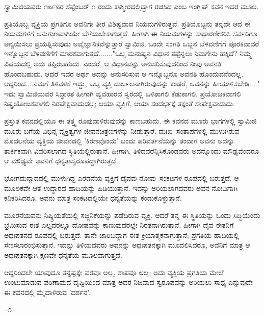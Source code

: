 ಸ್ವಾಮಿಜಿಯವರು ೧೮೯೮ರ ಸೆಪ್ಟೆಂಬರ್ ೧ ರಂದು ಕಾಶ್ಮೀರದಲ್ಲಿದ್ದಾಗ ರಚಿಸಿದ  ಎಂಬ ಇಂಗ್ಲಿಷ್ ಕವನ ಇದರ ಮೂಲ.

ಪ್ರತಿಯೊಬ್ಬ ವ್ಯಕ್ತಿಯ ಪ್ರಗತಿಗೂ ಅವನಿಗೇ ತೀರ ವಿಶಿಷ್ಟವಾದ ನಿಯಮಗಳಿರುತ್ತವೆ. ಪ್ರತಿಯೊಬ್ಬನು ತನ್ನದೇ ಆದ ಈ ನಿಯಮಗಳಿಗೆ ಅನುಗುಣವಾಗಿಯೇ ಬೆಳೆಯಬೇಕಾಗುತ್ತದೆ. ಹೀಗಾಗಿ ಈ ನಿಯಮಗಳನ್ನು ಸಾಧಾರಣೀಕರಿಸಿ ಸರ್ವರಿಗೂ ಅನ್ವಯಿಸಲು ಪ್ರಯತ್ನಿಸುವುದು ಅವೈಜ್ಞಾನಿಕವೆನ್ನುತ್ತಾರೆ ಸ್ವಾಮಿಜಿ, ಒಂದೇ ಸಂಗತಿ ಒಬ್ಬನ ಬೆಳವಣಿಗೆಗೆ ಪೂರಕವಾದರೆ ಇನ್ನೊಬ್ಬನ ಬೆಳವಣಿಗೆಗೆ ಮಾರಕವಾಗುತ್ತದೆ......."ಒಬ್ಬ ಮನುಷ್ಯನ ವಿಧಾನ ತಪ್ಪೆನ್ನಲು ನಿಮಗೇನು ಹಕ್ಕಿದೆ? ನಿಮ್ಮ ವಿಷಯದಲ್ಲಿ ಅದು ತಪ್ಪಿರಬಹುದು. ಎಂದರೆ, ಆ ವಿಧಾನವನ್ನು ಅನುಸರಿಸುವುದರಿಂದ ನೀವು ಅವನತಿ ಹೊಂದಬಹುದು. ಆದರೆ ಇದರ ಅರ್ಥ ಅದನ್ನು ಅನುಸರಿಸುವ ಆ ಇನ್ನೊಬ್ಬನೂ ಅವನತಿ ಹೊಂದುವನೆಂದಲ್ಲ. ಆದ್ದರಿಂದ....ನಿಮಗೆ ತಿಳಿವಳಿಕೆ ಇದ್ದು, ಒಬ್ಬ ವ್ಯಕ್ತಿ ದುರ್ಬಲನಾಗಿರುವುದನ್ನು ಕಂಡರೆ, ಅವನನ್ನು ಹೀಯಾಳಿಸಬೇಡಿ...." ಇದು ಸ್ವಾಮಿಜಿಯವರ ಸಿದ್ಧಾಂತ  ಹೀಗಾಗಿ ವ್ಯವಹಾರದ ಸ್ವರದಲ್ಲಿ ಒಳಿತಾಗಲಿ ಕೆಡುಕಾಗಲಿ, ಪ್ರಯೋಜಕವಾಗಲಿ ನಿಷ್ಪ್ರಯೋಜಕವಾಗಲಿ ನಿರಪೇಕ್ಷವಾದುದಲ್ಲ; ಆಯಾ ವ್ಯಕ್ತಿಗೆ, ಆಯಾ ಸಂದರ್ಭಕ್ಕೆ ತಕ್ಕಂತೆ ಸಾಪೇಕ್ಷವಾದುದು.

ಪ್ರಸ್ತುತ ಕವನದಲ್ಲಿಯೂ ಈ ತತ್ತ್ವ ರೂಪುದಾಳಿರುವುದನ್ನು ಕಾಣಬಹುದು. ಈ ಕವನದ ಮೂರು ಭಾಗಗಳಲ್ಲಿ ಸ್ವಾಮಿಜಿ ಮೂರು ಬಗೆಯ ವಿಭಿನ್ನ ವ್ಯಕ್ತಿತ್ವಗಳ ಜೀವನಚಿತ್ರಣಗಳನ್ನು ನೀಡುತ್ತಾರೆ. ದುಃಖ–ಸಂತಾಪಗಳಲ್ಲಿ ಮುಳುಗಿರುವ ಮೊದಲನೆಯ ವ್ಯಕ್ತಿಯ ಜೀವನದಲ್ಲಿ 'ಕಿರಣವೊಂದು' ಬಂದು ಪರಿವರ್ತನೆಯನ್ನು ತಂದಾಗ ಅವನು ಅದನ್ನು ತಾರ್ಕಿಕವಾಗಿ ವಿವರಿಸಲಾಗದ ಸ್ಥಿತಿಯಲ್ಲಿರುತ್ತಾನೆ. ಹೀಗಾಗಿ, ತಿಳಿದವರೆನ್ನಿಸಿಕೊಂಡವರು ಅದನ್ನೊಂದು ಮೌಢ್ಯವೆಂದರೂ ಆ ಮೌಢ್ಯವೇ ಅವನಿಗೆ ಧನ್ಯತಾಸ್ವರೂಪದ್ದಾಗಿರುತ್ತದೆ.

ಭೋಗದುನ್ಮಾದದಲ್ಲಿ ಮುಳುಗಿದ್ದ ಎರಡನೆಯ ವ್ಯಕ್ತಿಗೆ ದೈವವು ನೋವು–ಸಂಕಟಗಳ ರೂಪದಲ್ಲಿ ಬರುತ್ತದೆ. ಆ ಮೂಲಕವೇ ಆತ ಉದ್ಧಾರದ ಹಾದಿಯನ್ನು ಹಿಡಿಯುತ್ತಾನೆ. ಇದನ್ನು ಅರಿಯಲಾಗದವರು ಅವನ ನೋವಿಗಾಗಿ ಕನಿಕರಿಸಿದರೂ, ಅವನು ಮಾತ್ರ ಸಂಕಟದಲ್ಲಿಯೇ ಧನ್ಯತೆಯನ್ನು ಕಂಡುಕೊಳ್ಳುತ್ತಾನೆ.

ಮೂರನೆಯವನು ನಿಷ್ಕ್ರಿಯತೆಯಲ್ಲಿ ಸಜ್ಜನಿಕೆಯನ್ನು ಪಡೆದಿರುವ ವ್ಯಕ್ತಿ. ಆದರೆ ತನ್ನ ಈ ಸ್ಥಿತಿಯನ್ನು ಒಂದು ಸಿದ್ಧಿಯೆಂದು ಭ್ರಮಿಸುವ ಈತ ಎಲ್ಲದರಲ್ಲೂ ದೋಷವನ್ನು ಕಾಣುವುದರಲ್ಲೇ ನಿರತನಾಗಿರುತ್ತಾನೆ. ಹೀಗಾಗಿ ದೈವ ಈತನಿಗೆ ಅಧಃಪತನದ ರೂಪದಲ್ಲಿ ಬರುತ್ತದೆ. ತಾನೇ ಜಾರಿಬಿದ್ದಾಗ ಈತ ಕ್ರಿಯಾತ್ಮಕನಾಗುತ್ತಾನೆ; ಪ್ರಗತಿಯ ಹಾದಿಯಲ್ಲಿ ಸೆಣಸಲಾರಂಭಿಸುತ್ತಾನೆ. ಇದನ್ನು ತಿಳಿಯದವರು ಅವನನ್ನು ಅಧಃಪತನಕ್ಕಾಗಿ ಮೂದಲಿಸಿದರೂ, ಅವನಿಗೆ ಮಾತ್ರ ಆ ಅಧಃಪತನಕ್ಕಾಗಿ ಕ್ಷಣವೇ ಧನ್ಯತೆಯ ಮೂಲವಾಗುತ್ತದೆ.

ಆದ್ದರಿಂದಲೇ ಯಾವುದೂ ತನ್ನಷ್ಟಕ್ಕೇ ವರವೂ ಅಲ್ಲ, ಶಾಪವೂ ಅಲ್ಲ; ಅದು ವ್ಯಕ್ತಿಯ ಪ್ರಗತಿಯ ಮೇಲೆ ಉಂಟುಮಾಡುವ ಪರಿಣಾಮದ ದೃಷ್ಟಿಯಿಂದ ಮಾತ್ರ ಅದರ ನಿಜವಾದ ಸ್ವರೂಪವನ್ನು ಅರಿಯಲು ಸಾಧ್ಯ ಎನ್ನುವುದೇ ಈ ಕವನದಲ್ಲಿ ಮೈದಾಳಿರುವ 'ದರ್ಶನ'.

\begin{center}
–೧–
\end{center}

